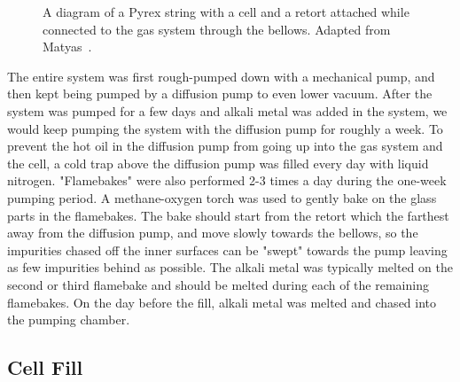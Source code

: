 \begin{figure}[t!]
	\centering
	\caption{{A diagram of a Pyrex string with a cell and a retort attached while connected to the gas system through the bellows. Adapted from Matyas~\cite{DanThesis}.}}
	\label{cell_gas_system}
\end{figure}

The entire system was first rough-pumped down with a mechanical pump, and then kept being pumped by a diffusion pump to even lower vacuum. After the system was pumped for a few days and alkali metal was added in the system, we would keep pumping the system with the diffusion pump for roughly a week. To prevent the hot oil in the diffusion pump from going up into the gas system and the cell, a cold trap above the diffusion pump was filled every day with liquid nitrogen. "Flamebakes" were also performed 2-3 times a day during the one-week pumping period. A methane-oxygen torch was used to gently bake on the glass parts in the flamebakes. The bake should start from the retort which the farthest away from the diffusion pump, and move slowly towards the bellows, so the impurities chased off the inner surfaces can be "swept" towards the pump leaving as few impurities behind as possible. The alkali metal was typically melted on the second or third flamebake and should be melted during each of the remaining flamebakes. On the day before the fill, alkali metal was melted and chased into the pumping chamber.

\subsection{Cell Fill}

